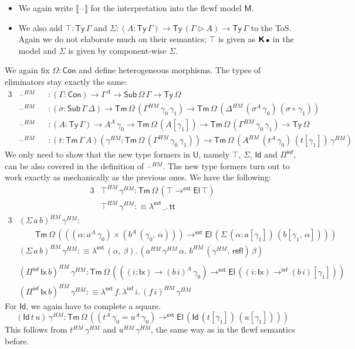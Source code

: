 \documentclass[12pt,a4paper,twoside,openany]{book}
\theoremstyle{remark}
\theoremstyle{definition}
\theoremstyle{theorem}
\newcommand{\ms}[1]{\mathsf{#1}}
\newcommand{\bs}[1]{\boldsymbol{#1}}
\newcommand{\refl}{\mathsf{refl}}
\newcommand{\Con}{\mathsf{Con}}
\newcommand{\Sub}{\mathsf{Sub}}
\newcommand{\Tm}{\mathsf{Tm}}
\newcommand{\Ty}{\mathsf{Ty}}
\newcommand{\U}{\mathsf{U}}
\newcommand{\El}{\mathsf{El}}
\newcommand{\Id}{\mathsf{Id}}
\renewcommand{\tt}{\mathsf{tt}}
\newcommand{\blank}{\mathord{\hspace{1pt}\text{--}\hspace{1pt}}}
\newcommand{\ext}{\triangleright}
\newcommand{\toe}{\to^{\ms{ext}}}
\newcommand{\Piinf}{\Pi^{\mathsf{inf}}}
\newcommand{\toinf}{\to^{\ms{inf}}}
\newcommand{\lambdainf}{\lambda^{\ms{inf}}}
\newcommand{\lambdae}{\lambda^{\ms{ext}}}
\newcommand{\bemptycon}{\scaleobj{.75}{\bs{\bullet}}}
\newcommand{\bM}{\bs{\mathsf{M}}}
\newcommand{\llb}{\llbracket}
\newcommand{\rrb}{\rrbracket}
\newcommand{\defn}{:\equiv}
\begin{document}
\begin{itemize}
  \item
  We again write $\llb\blank\rrb$ for the interpretation into the flcwf model $\bM$.
  \item
  We also add $\top : \Ty\,\Gamma$ and $\Sigma : (A : \Ty\,\Gamma) \to
  \Ty\,(\Gamma \ext A) \to \Ty\,\Gamma$ to the ToS. Again we do not elaborate
  much on their semantics; $\top$ is given as ${\bs{\ms{K}}\,\bemptycon}$ in
  the model and $\Sigma$ is given by component-wise $\Sigma$.
\end{itemize}
We again fix $\Omega : \Con$ and define heterogeneous morphisms. The types of
eliminators stay exactly the same:
\begin{alignat*}{3}
  &\blank^{HM} &&: (\Gamma : \Con) \to \Gamma^A \to \Sub\,\Omega\,\Gamma \to \Ty\,\Omega\\
  &\blank^{HM} &&: (\sigma : \Sub\,\Gamma\,\Delta) \to \Tm\,\Omega\,(\Gamma^{HM}\,\gamma_0\,\gamma_1) \to \Tm\,\Omega\,(\Delta^{HM}\,(\sigma^A\,\gamma_0)\,(\sigma \circ\,\gamma_1))\\
  &\blank^{HM} &&: (A : \Ty\,\Gamma) \to A^A\,\gamma_0 \to \Tm\,\Omega\,(A[\gamma_1])
  \to \Tm\,\Omega\,(\Gamma^{HM}\,\gamma_0\,\gamma_1) \to \Ty\,\Omega\\
  &\blank^{HM} &&: (t : \Tm\,\Gamma\,A)(\gamma^{HM} : \Tm\,\Omega\,(\Gamma^{HM}\,\gamma_0\,\gamma_1))
   \to \Tm\,\Omega\,(A^{HM}\,(t^A\,\gamma_0)\,(t[\gamma_1])\,\gamma^{HM})
\end{alignat*}
We only need to show that the new type formers in $\U$, namely $\top$, $\Sigma$,
$\Id$ and $\Piinf$, can be also covered in the definition of $\blank^{HM}$. The
new type formers turn out to work exactly as mechanically as the previous
ones. We have the following:
\begin{alignat*}{3}
  & \top^{HM}\,\gamma^{HM} : \Tm\,\Omega\,(\top \toe \El\,\top)\\
  & \top^{HM}\,\gamma^{HM} \defn \lambdae\,\_.\,\tt
\end{alignat*}
\begin{alignat*}{3}
  & (\Sigma\,a\,b)^{HM}\,\gamma^{HM} : \\
  & \hspace{2em} \Tm\,\Omega\,(((\alpha : a^A\,\gamma_0) \times (b^A\,(\gamma_0,\,\alpha))) \toe \El\,(\Sigma\,(\alpha : a[\gamma_1])\,(b[\gamma_1,\,\alpha])))\\
  & (\Sigma\,a\,b)^{HM}\,\gamma^{HM} \defn \lambdae\,(\alpha,\,\beta).\,(a^{HM}\,\gamma^{HM}\,\alpha,\,b^{HM}\,(\gamma^{HM},\,\refl)\,\beta)\\
  & \\
  & (\Piinf\,\ms{Ix}\,b)^{HM}\,\gamma^{HM} : \Tm\,\Omega\,(((i : \ms{Ix}) \to (b\,i)^A\,\gamma_0) \toe \El\,((i : \ms{Ix}) \toinf (b\,i)[\gamma_1]))\\
  & (\Piinf\,\ms{Ix}\,b)^{HM}\,\gamma^{HM} \defn \lambdae\,f.\,\lambdainf\,i.\,(f\,i)^{HM}\,\gamma^{HM}
\end{alignat*}
For $\Id$, we again have to complete a square.
\[
(\Id\,t\,u)\,\gamma^{HM} : \Tm\,\Omega\,((t^A\,\gamma_0 = u^A\,\gamma_0) \toe \El\,(\Id\,(t[\gamma_1])\,(u[\gamma_1])))
\]
This follows from $t^{HM}\,\gamma^{HM}$ and $u^{HM}\,\gamma^{HM}$, the same way
as in the flcwf semantics before.
\end{document}
